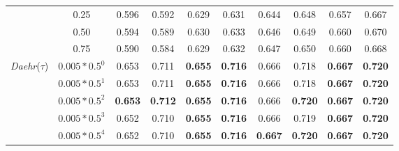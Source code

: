 \documentclass[journal,compsoc]{IEEEtran}
\newcommand{\TheName}{\mbox{\emph{Daehr}}}
\begin{document}
\begin{table}
{\begin{center}
\begin{tabular}{*{10}{c}}
& 0.25 &   0.596 & 0.592  &     0.629 & 0.631     & 0.644 & 0.648      & 0.657 & 0.667     \\   			& 0.50 &   0.594 & 0.589 &     0.630 & 0.633      & 0.646 & 0.649     & 0.660 & 0.670     \\
& 0.75 &   0.590 & 0.584  &     0.629 & 0.632     & 0.647 & 0.650     & 0.660 & 0.668     \\
     \cmidrule(lr){1-2}                        
\cmidrule(lr){3-4}
\cmidrule(lr){5-6}
\cmidrule(lr){7-8}
\cmidrule(lr){9-10}
     \multirow{5}{*}{\TheName($\tau$)} 
     & $0.005*0.5^{0}$ &   0.653 & 0.711 &     \textbf{0.655} & \textbf{0.716}      & 0.666 & 0.718     & \textbf{0.667} & \textbf{0.720}    \\
     & $0.005*0.5^{1}$ &   0.653 & 0.711  &     \textbf{0.655} & \textbf{0.716}      & 0.666 & 0.718      & \textbf{0.667} & \textbf{0.720}   \\     
     & $0.005*0.5^{2}$ &   \textbf{0.653} & \textbf{0.712} &     \textbf{0.655} & \textbf{0.716}      & 0.666 & \textbf{0.720}     & \textbf{0.667} & \textbf{0.720}  \\
     & $0.005*0.5^{3}$ &   0.652 & 0.710  &     \textbf{0.655} & \textbf{0.716}      & 0.666 & 0.719     &\textbf{0.667} & \textbf{0.720}    \\
     & $0.005*0.5^{4}$ &   0.652 & 0.710  &     \textbf{0.655} & \textbf{0.716}       & \textbf{0.667} & \textbf{0.720}     & \textbf{0.667} & \textbf{0.720}    \\     
     \bottomrule

\end{tabular}
\end{center}}
\end{table}
\end{document}
